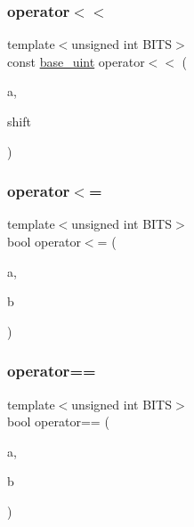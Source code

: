 \mbox{\label{classbase__uint_acee16d973ae59087cd962720773f53dd}} 
\subsubsection{\texorpdfstring{operator$<$$<$}{operator<<}}
{\footnotesize\ttfamily template$<$unsigned int B\+I\+TS$>$ \\
const \mbox{\hyperlink{classbase__uint}{base\+\_\+uint}} operator$<$$<$ (\begin{DoxyParamCaption}\item[{const \mbox{\hyperlink{classbase__uint}{base\+\_\+uint}}$<$ B\+I\+TS $>$ \&}]{a,  }\item[{int}]{shift }\end{DoxyParamCaption})\hspace{0.3cm}{\ttfamily [friend]}}

\mbox{\label{classbase__uint_ac7f1bdba7208bd852f7b00f7c49624f8}} 
\subsubsection{\texorpdfstring{operator$<$=}{operator<=}}
{\footnotesize\ttfamily template$<$unsigned int B\+I\+TS$>$ \\
bool operator$<$= (\begin{DoxyParamCaption}\item[{const \mbox{\hyperlink{classbase__uint}{base\+\_\+uint}}$<$ B\+I\+TS $>$ \&}]{a,  }\item[{const \mbox{\hyperlink{classbase__uint}{base\+\_\+uint}}$<$ B\+I\+TS $>$ \&}]{b }\end{DoxyParamCaption})\hspace{0.3cm}{\ttfamily [friend]}}

\mbox{\label{classbase__uint_aafca305decdfd2ded4688213ab4a55fa}} 
\subsubsection{\texorpdfstring{operator==}{operator==}\hspace{0.1cm}{\footnotesize\ttfamily [1/2]}}
{\footnotesize\ttfamily template$<$unsigned int B\+I\+TS$>$ \\
bool operator== (\begin{DoxyParamCaption}\item[{const \mbox{\hyperlink{classbase__uint}{base\+\_\+uint}}$<$ B\+I\+TS $>$ \&}]{a,  }\item[{const \mbox{\hyperlink{classbase__uint}{base\+\_\+uint}}$<$ B\+I\+TS $>$ \&}]{b }\end{DoxyParamCaption})\hspace{0.3cm}{\ttfamily [friend]}}

